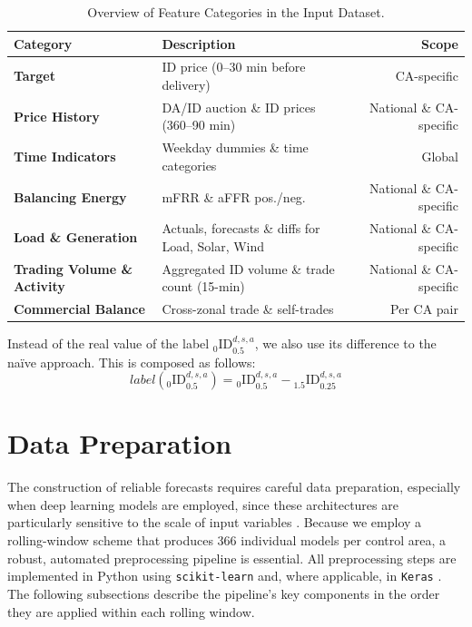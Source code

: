 \documentclass[preprint,12pt,nonatbib]{elsarticle}
\begin{document}
\begin{table}[htbp]
    \centering
    \caption{Overview of Feature Categories in the Input Dataset.}
    \label{tab:scenarios_overview}
    \small
    \begin{tabular}{llr}
        \toprule
        \textbf{Category} & \textbf{Description} & \textbf{Scope} \\
        \midrule
        \textbf{Target} \cite{EPEXSPOT.2024} & ID price (0--30 min before delivery) & CA-specific \\
        \textbf{Price History} \cite{EPEXSPOT.2024} & DA/ID auction \& ID prices (360--90 min) & National \& CA-specific \\
        \textbf{Time Indicators} & Weekday dummies \& time categories & Global \\
        \textbf{Balancing Energy} \cite{Netztransparenz.2024} & mFRR \& aFFR pos./neg. & National \& CA-specific \\
        \textbf{Load \& Generation} \cite{entsoe.2023} & Actuals, forecasts \& diffs for Load, Solar, Wind & National \& CA-specific \\
        \textbf{Trading Volume \& Activity} \cite{EPEXSPOT.2024} & Aggregated ID volume \& trade count (15-min) & National \& CA-specific \\
        \textbf{Commercial Balance} \cite{EPEXSPOT.2024} & Cross-zonal trade \& self-trades & Per CA pair \\
        \bottomrule
    \end{tabular}
\end{table}

Instead of the real value of the label \({}_0^{\;}\!\text{ID}_{0.5}^{d,s,a}\), we also use its difference to the naïve approach. This is composed as follows:
\begin{equation}
    label\left({}_{0}^{\;}\!\text{ID}_{0.5}^{d,s,a}\right)={}_{0}^{\;}\!\text{ID}_{0.5}^{d,s,a}-{}_{1.5}^{\;}\!\text{ID}_{0.25}^{d,s,a}
    \label{eq:Formel2}
\end{equation}

\section{Data Preparation}
\label{sec:DataPreparation}

The construction of reliable forecasts requires careful data preparation, especially when deep learning models are employed, since these architectures are particularly sensitive to the scale of input variables
\cite{Lago.2018}.
Because we employ a rolling-window scheme that produces 366 individual models per control area, a robust, automated preprocessing pipeline is essential.
All preprocessing steps are implemented in Python using \texttt{scikit-learn} \cite{Pedregosa.2011} and, where applicable, in \texttt{Keras} \cite{chollet2015keras}.
The following subsections describe the pipeline's key components in the order they are applied within each rolling window.
\end{document}
